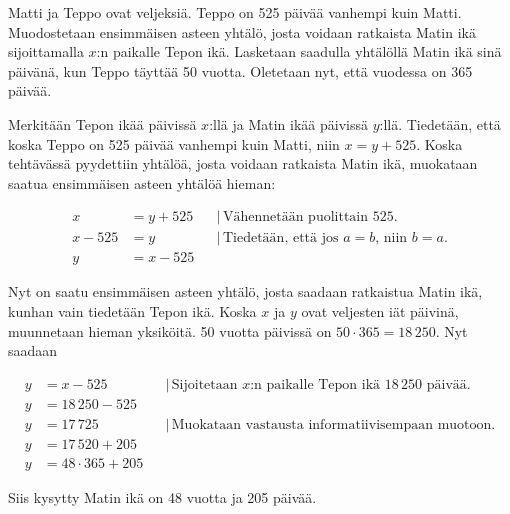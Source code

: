 \begin{esimerkki} 
Matti ja Teppo ovat veljeksiä. Teppo on 525 päivää vanhempi kuin Matti. Muodostetaan ensimmäisen asteen yhtälö, 
josta voidaan ratkaista Matin ikä sijoittamalla $x$:n paikalle Tepon ikä. Lasketaan saadulla yhtälöllä Matin ikä sinä päivänä, kun 
Teppo täyttää 50 vuotta. Oletetaan nyt, että vuodessa on 365 päivää.

Merkitään Tepon ikää päivissä $x$:llä ja Matin ikää päivissä $y$:llä. Tiedetään, että koska Teppo on 525 päivää vanhempi kuin 
Matti, niin $x=y+525$. Koska tehtävässä pyydettiin yhtälöä, josta voidaan ratkaista Matin ikä, muokataan saatua ensimmäisen asteen 
yhtälöä hieman:

      \begin{align*}
	   x &= y+525 & &| \, \text{Vähennetään puolittain 525.} \\
	   x-525 &= y & &| \, \text{Tiedetään, että jos $a=b$, niin $b=a$.} \\
	   y &= x-525 & &
      \end{align*}
      
Nyt on saatu ensimmäisen asteen yhtälö, josta saadaan ratkaistua Matin ikä, kunhan vain tiedetään Tepon ikä. Koska $x$ ja $y$ ovat 
veljesten iät päivinä, muunnetaan hieman yksiköitä. 50 vuotta päivissä on $50 \cdot 365 = 18\,250$. Nyt saadaan

      \begin{align*}
	  y &= x-525 & &| \, \text{Sijoitetaan $x$:n paikalle Tepon ikä $18\,250$ päivää.} \\
	  y &= 18\,250-525 & & \\
	  y &= 17\,725 & &| \, \text{Muokataan vastausta informatiivisempaan muotoon.} \\
	  y &= 17\,520+205 & & \\
	  y &= 48 \cdot 365 +205 & &
      \end{align*}
      
  Siis kysytty Matin ikä on 48 vuotta ja 205 päivää.
  
\end{esimerkki}
